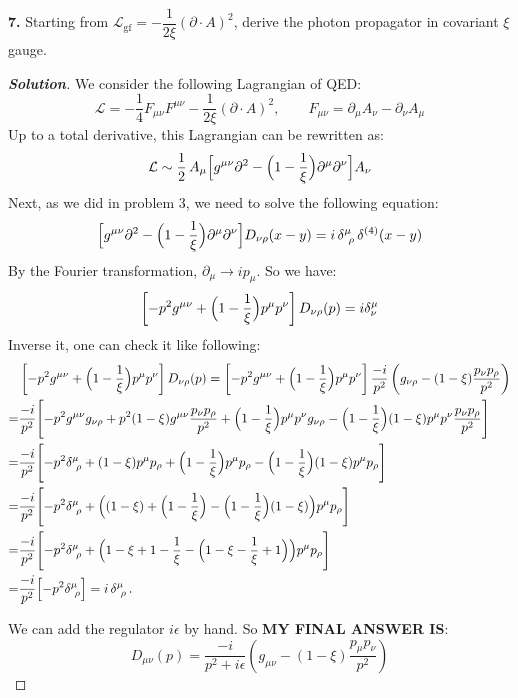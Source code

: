 \documentclass[11pt]{article}
\newenvironment{solution}[1][]{\begin{proof}[\textbf{Solution}]}{\end{proof}}
\begin{document}
	\begin{tcolorbox}[problem]
		\textbf{7.} Starting from \(\mathcal L_{\text{gf}}=-\dfrac{1}{2\xi}(\partial\cdot A)^2\), derive the photon propagator in covariant \(\xi\) gauge.
	\end{tcolorbox}
	\begin{solution}[11.7]
		We consider the following Lagrangian of QED:
		\[
		\mathcal L
		=-\frac14 F_{\mu\nu}F^{\mu\nu}-\frac{1}{2\xi}(\partial\!\cdot\!A)^2
		,\qquad
		F_{\mu\nu}=\partial_\mu A_\nu-\partial_\nu A_\mu
		\]
		Up to a total derivative, this Lagrangian can be rewritten as:
		\[
		\mathcal L
		\sim\frac12\,A_\mu
		\Bigl[g^{\mu\nu}\partial^2-\Bigl(1-\frac{1}{\xi}\Bigr)\partial^\mu\partial^\nu\Bigr]
		A_\nu
		\]
		Next, as we did in problem 3, we need to solve the following equation:
		\[
		\Bigl[g^{\mu\nu}\partial^2-\Bigl(1-\frac{1}{\xi}\Bigr)\partial^\mu\partial^\nu\Bigr]D_{\nu\rho}(x-y)=i\,\delta^\mu_{\ \rho}\,\delta^{(4)}(x-y)
		\]
		By the Fourier transformation, $\partial_\mu\to i p_\mu$. So we have:
		\[
		\left[-p^2 g^{\mu\nu}
		+\Bigl(1-\frac{1}{\xi}\Bigr)p^\mu p^\nu\right]D_{\nu\rho}(p)=i\delta^{\mu}_{\nu}
		\]
		Inverse it, one can check it like following:
\[
\begin{aligned}
	&\left[-p^2 g^{\mu\nu}
	+\Bigl(1-\frac{1}{\xi}\Bigr)p^\mu p^\nu\right]D_{\nu\rho}(p)
	=\left[-p^2 g^{\mu\nu}
	+\Bigl(1-\frac{1}{\xi}\Bigr)p^\mu p^\nu\right]
	\frac{-i}{p^2}\left(g_{\nu\rho}-(1-\xi)\frac{p_\nu p_\rho}{p^2}\right)
	\\
	=&\frac{-i}{p^2}\Biggl[
	-p^2 g^{\mu\nu}g_{\nu\rho}
	+p^2(1-\xi)g^{\mu\nu}\frac{p_\nu p_\rho}{p^2}
	+\Bigl(1-\frac{1}{\xi}\Bigr)p^\mu p^\nu g_{\nu\rho}
	-\Bigl(1-\frac{1}{\xi}\Bigr)(1-\xi)p^\mu p^\nu\frac{p_\nu p_\rho}{p^2}
	\Biggr]
	\\
	=&\frac{-i}{p^2}\Biggl[
	-p^2\delta^\mu_{\ \rho}
	+(1-\xi)p^\mu p_\rho
	+\Bigl(1-\frac{1}{\xi}\Bigr)p^\mu p_\rho
	-\Bigl(1-\frac{1}{\xi}\Bigr)(1-\xi)p^\mu p_\rho
	\Biggr]
	\\
	=&\frac{-i}{p^2}\Biggl[
	-p^2\delta^\mu_{\ \rho}
	+\Bigl((1-\xi)+\Bigl(1-\frac{1}{\xi}\Bigr)-\Bigl(1-\frac{1}{\xi}\Bigr)(1-\xi)\Bigr)p^\mu p_\rho
	\Biggr]
	\\
	=&\frac{-i}{p^2}\Biggl[
	-p^2\delta^\mu_{\ \rho}
	+\Bigl(1-\xi+1-\frac{1}{\xi}-\Bigl(1-\xi-\frac{1}{\xi}+1\Bigr)\Bigr)p^\mu p_\rho
	\Biggr]
	\\
	=&\frac{-i}{p^2}\Bigl[-p^2\delta^\mu_{\ \rho}\Bigr]
	=i\,\delta^\mu_{\ \rho}\,.
\end{aligned}
\]

		We can add the regulator $i\epsilon$ by hand. So 	\textbf{MY FINAL ANSWER IS}:
				\[
		\boxed{
			D_{\mu\nu}(p)
			=\frac{-i}{p^2+i\epsilon}
			\left(
			g_{\mu\nu}-(1-\xi)\frac{p_\mu p_\nu}{p^2}
			\right)
		}
		\]
	\end{solution}
	
\end{document}

